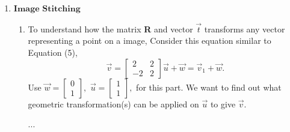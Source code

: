 \documentclass[11pt]{article}
\begin{document}
\begin{enumerate}
\begin{enumerate}
   \end{enumerate}
   \newpage
   \item $\textbf{Image Stitching}$
       \begin{enumerate}
           \item To understand how the matrix \textbf{R} and vector $\vec t$ transforms any vector representing a point on a image,
            Consider this equation similar to Equation (5),
                \[
                	\vec v = \begin{bmatrix}
                    		    2 & 2 \\
                			   -2 & 2
                	\end{bmatrix} \vec u + \vec w 
                    = \vec v_1 + \vec w.
                \]
                Use $\vec w = \begin{bmatrix}
                				0 \\
                				1
                            \end{bmatrix},
                    $
                    $\vec u = \begin{bmatrix}
                				1 \\
                				1
                            \end{bmatrix},$
                            for this part.
                We want to find out what geometric transformation(s) can be applied on $\vec u$ to give $\vec v$.
                \begin{Answer}
                    ...
                \end{Answer}
                

\end{enumerate}
\end{enumerate}
\end{document}
